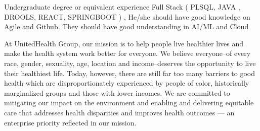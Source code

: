 Undergraduate degree or equivalent experience
Full Stack ( PLSQL, JAVA , DROOLS, REACT, SPRINGBOOT ) , He/she should have good knowledge on Agile and Github. They should have good understanding in AI/ML and Cloud

At UnitedHealth Group, our mission is to help people live healthier lives and make the health system work better for everyone. We believe everyone–of every race, gender, sexuality, age, location and income–deserves the opportunity to live their healthiest life. Today, however, there are still far too many barriers to good health which are disproportionately experienced by people of color, historically marginalized groups and those with lower incomes. We are committed to mitigating our impact on the environment and enabling and delivering equitable care that addresses health disparities and improves health outcomes — an enterprise priority reflected in our mission.

